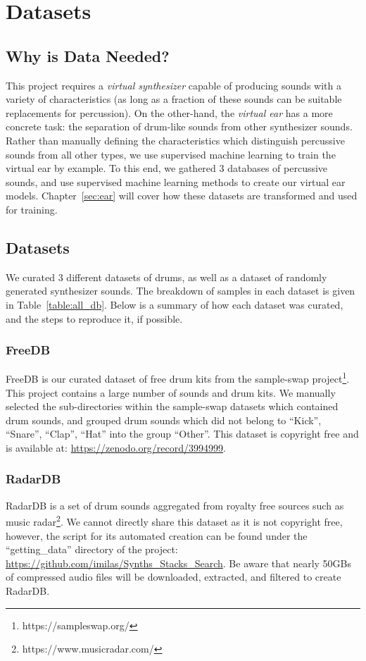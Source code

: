 \documentclass[\main/thesis.tex]{subfiles}
\begin{document}
\chapter{Datasets}
\label{sec:datasets}
\section{Why is Data Needed?}
This project requires a \textit{virtual synthesizer} capable of producing sounds with a variety of characteristics (as long as a fraction of these sounds can be suitable replacements for percussion). On the other-hand, the \textit{virtual ear} has a more concrete task: the separation of drum-like sounds from other synthesizer sounds. Rather than manually defining the characteristics which distinguish percussive sounds from all other types, we use supervised machine learning to train the virtual ear by example. To this end, we gathered 3 databases of percussive sounds, and use supervised machine learning methods to create our virtual ear models. Chapter~\ref{sec:ear} will cover how these datasets are transformed and used for training.


\section{Datasets}
We curated 3 different datasets of drums, as well as a dataset of randomly generated synthesizer sounds.  The breakdown of samples in each dataset is given in Table~\ref{table:all_db}. Below is a summary of how each dataset was curated, and the steps to reproduce it, if possible. 
\subsection{FreeDB}
FreeDB is our curated dataset of free drum kits from the sample-swap project\footnote{https://sampleswap.org/}. This project contains  a large number of sounds and drum kits. We manually selected the sub-directories within the sample-swap datasets which contained drum sounds, and grouped drum sounds which did not belong to \enquote{Kick}, \enquote{Snare}, \enquote{Clap}, \enquote{Hat} into the group \enquote{Other}. This dataset is copyright free and is available at: \url{https://zenodo.org/record/3994999}. 
\subsection{RadarDB}
RadarDB is a set of drum sounds aggregated from royalty free sources such as music radar\footnote{https://www.musicradar.com/}. We cannot directly share this dataset as it is not copyright free, however, the script for its automated creation can be found under the \enquote{getting\_data} directory of the project: \url{https://github.com/imilas/Synths_Stacks_Search}. Be aware that nearly 50GBs of compressed audio files will be downloaded, extracted, and filtered to create RadarDB. 
\end{document}
